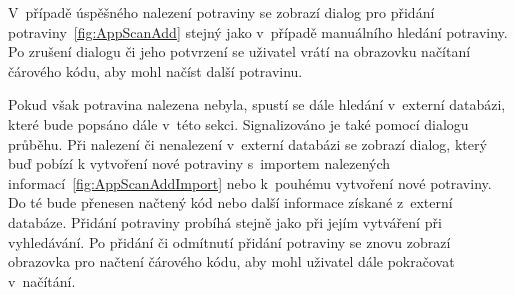 \documentclass[thesis=B,czech]{FITthesis}[2013/10/20]
\begin{document}
V~případě úspěšného nalezení potraviny se zobrazí dialog pro přidání potraviny~\ref{fig:AppScanAdd} stejný jako v~případě manuálního hledání potraviny. Po zrušení dialogu či jeho potvrzení se uživatel vrátí na obrazovku načítaní čárového kódu, aby mohl načíst další potravinu.

Pokud však potravina nalezena nebyla, spustí se dále hledání v~externí databázi, které bude popsáno dále v~této sekci. Signalizováno je také pomocí dialogu průběhu. Při nalezení či nenalezení v~externí databázi se zobrazí dialog, který buď pobízí k vytvoření nové potraviny s~importem nalezených informací~\ref{fig:AppScanAddImport} nebo k~pouhému vytvoření nové potraviny. Do té bude přenesen načtený kód nebo další informace získané z~externí databáze. Přidání potraviny probíhá stejně jako při jejím vytváření při vyhledávání. Po přidání či odmítnutí přidání potraviny se znovu zobrazí obrazovka pro načtení čárového kódu, aby mohl uživatel dále pokračovat v~načítání.
\end{document}
